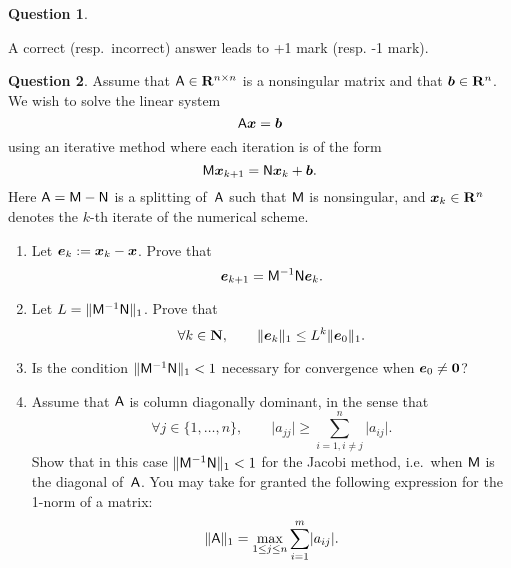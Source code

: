 \documentclass[11pt]{article}
\theoremstyle{definition}
\newtheorem{question}{Question}
\begin{document}
\begin{question}
\begin{enumerate}

    \end{enumerate}
    A correct (resp.~incorrect) answer leads to +1 mark (resp. -1 mark).
\end{question}

\newpage
\begin{question}
    Assume that $\mathsf A \in \mathbf R^{n \times n}$ is a nonsingular matrix and that $\mathbf{\boldsymbol{b}} \in \mathbf R^n$.
    We wish to solve the linear system
    \[
        \mathsf A \mathbf{\boldsymbol{x}} = \mathbf{\boldsymbol{b}}
    \]
    using an iterative method where each iteration is of the form
    \[
        \mathsf M \mathbf{\boldsymbol{x}}_{k+1} = \mathsf N \mathbf{\boldsymbol{x}}_k + \mathbf{\boldsymbol{b}}.
    \]
    Here $\mathsf A = \mathsf M - \mathsf N$ is a splitting of~$\mathsf A$ such that $\mathsf M$ is nonsingular,
    and $\mathbf{\boldsymbol{x}}_k \in \mathbf R^n$ denotes the $k$-th iterate of the numerical scheme.

    \begin{enumerate}
        \item
            Let $\mathbf{\boldsymbol{e}}_k := \mathbf{\boldsymbol{x}}_k - \mathbf{\boldsymbol{x}}$.
            Prove that
            \[
                \mathbf{\boldsymbol{e}}_{k+1} = \mathsf M^{-1} \mathsf N \mathbf{\boldsymbol{e}}_k.
            \]

        \item
            Let $L = \lVert\mathsf M^{-1} \mathsf N\rVert_1$.
            Prove that
            \[
                \forall k \in \mathbf N, \qquad
                \lVert\mathbf{\boldsymbol{e}}_k\rVert_1 \leq L^k \lVert\mathbf{\boldsymbol{e}}_0\rVert_1.
            \]

        \item
            Is the condition $\lVert\mathsf M^{-1} \mathsf N\rVert_1 < 1$ necessary
            for convergence when $\mathbf{\boldsymbol{e}}_0 \neq \mathbf{\boldsymbol{0}}$?

        \item
            Assume that $\mathsf A$ is column diagonally dominant, in the sense that
            \[
                \forall j \in \{1, \dotsc, n\}, \qquad
                \lvert a_{jj} \rvert \geq \sum_{i=1, i\neq j}^{n} \lvert a_{ij} \rvert.
            \]
            Show that in this case $\lVert\mathsf M^{-1} \mathsf N\rVert_1 < 1$ for the Jacobi method,
            i.e.\ when $\mathsf M$ is the diagonal of~$\mathsf A$.
            You may take for granted the following expression for the 1-norm of a matrix:
            \[
                \lVert\mathsf A\rVert_1 = \max_{1 \leq j \leq n} \sum_{i=1}^{m} \lvert a_{ij}\rvert.
            \]
    \end{enumerate}
\end{question}
\end{document}
